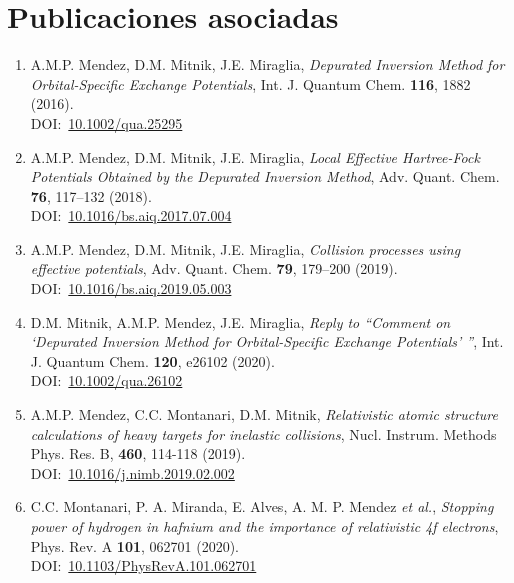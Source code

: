 \chapter*{Publicaciones asociadas}%
%

\begin{enumerate}

\item
A.M.P. Mendez, D.M. Mitnik, J.E. Miraglia,
\textit{Depurated Inversion Method for Orbital-Specific Exchange Potentials},
Int. J. Quantum Chem. \textbf{116}, 1882 (2016). \\
DOI:~\href{http://www.doi.org/10.1002/qua.25295}{10.1002/qua.25295}

\item
A.M.P. Mendez, D.M. Mitnik, J.E. Miraglia, 
\textit{Local Effective Hartree-Fock Potentials Obtained by the Depurated Inversion Method},
Adv. Quant. Chem. \textbf{76}, 117--132 (2018). \\
DOI:~\href{http://www.doi.org/10.1016/bs.aiq.2017.07.004}{10.1016/bs.aiq.2017.07.004}

\item
A.M.P. Mendez, D.M. Mitnik, J.E. Miraglia, 
\textit{Collision processes using effective potentials},
Adv. Quant. Chem. \textbf{79}, 179--200 (2019). \\
DOI:~\href{http://www.doi.org/10.1016/bs.aiq.2019.05.003}{10.1016/bs.aiq.2019.05.003}

\item
D.M. Mitnik, A.M.P. Mendez, J.E. Miraglia, 
\textit{Reply to ``Comment on `Depurated Inversion Method for Orbital-Specific
Exchange Potentials' ''}, 
Int. J. Quantum Chem. \textbf{120}, e26102 (2020). \\
DOI:~\href{http://www.doi.org/10.1002/qua.26102}{10.1002/qua.26102}

\item
A.M.P. Mendez, C.C. Montanari, D.M. Mitnik, 
\textit{Relativistic atomic structure calculations of heavy targets for inelastic collisions},
Nucl. Instrum. Methods Phys. Res. B, \textbf{460}, 114-118 (2019). \\
DOI:~\href{http://www.doi.org/10.1016/j.nimb.2019.02.002}{10.1016/j.nimb.2019.02.002}

\newpage
\item
C.C. Montanari, P. A. Miranda, E. Alves, A. M. P. Mendez \textit{et al.},
\textit{Stopping power of hydrogen in hafnium and the importance of relativistic 4f electrons},
Phys. Rev. A \textbf{101}, 062701 (2020). \\
DOI:~\href{http://www.doi.org/10.1103/PhysRevA.101.062701}{10.1103/PhysRevA.101.062701} 


\end{enumerate}
